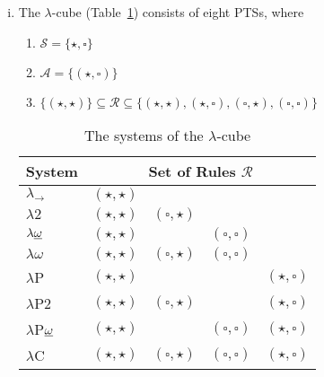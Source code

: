 \documentclass[oneside,a4paper]{article}
\numberwithin{equation}{section}
\begin{document}
\begin{enumerate}[(i)]

\item The $\lambda$-cube (Table~\ref{tab:lambda}) consists of eight PTSs, where

\begin{enumerate}
\item $\mathcal{S} = \{\star,\square\}$
\item $\mathcal{A} = \{(\star, \square)\}$
\item $\{(\star, \star)\} \subseteq \mathcal{R} \subseteq \{(\star, \star), (\star, \square), (\square, \star), (\square, \square)\}$
\end{enumerate}


\begin{table}[h!]
\centering
\begin{tabular}{|l|llll|}
\hline
System & \multicolumn{4}{|c|}{Set of Rules $\mathcal{R}$} \\ \hline
$\lambda_{\rightarrow}$ & $(\star, \star)$ & & & \\
$\lambda2$ & $(\star, \star)$ & $(\square, \star)$ & & \\ 
$\lambda\underbar{$\omega$}$ & $(\star, \star)$ & &  $(\square, \square)$ & \\ 
$\lambda\omega$ & $(\star, \star)$ & $(\square, \star)$ & $(\square, \square)$ & \\ 
$\lambda$P & $(\star, \star)$ & & & $(\star, \square)$ \\ 
$\lambda$P2 & $(\star, \star)$ & $(\square, \star)$ & & $(\star, \square)$ \\ 
$\lambda$P$\underbar{$\omega$}$ & $(\star, \star)$ & & $(\square, \square)$ & $(\star, \square)$ \\ 
$\lambda$C & $(\star, \star)$ & $(\square, \star)$ & $(\square, \square)$ & $(\star, \square)$ \\ \hline
\end{tabular}
\caption{The systems of the $\lambda$-cube}
\label{tab:lambda}
\end{table}






\end{enumerate}
\end{document}
